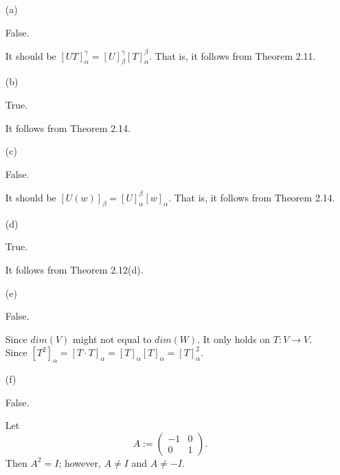 \begin{Exercise}
\begin{enumerate}[(a)]
\item[(a)]
\begin{answer}
False.
\end{answer}
\begin{solution}
It should be $[UT]_{\alpha}^{\gamma} = [U]_{\beta}^{\gamma}[T]_{\alpha}^{\beta}$. That is, it follows from Theorem 2.11.
\end{solution}

\item[(b)]
\begin{answer}
True.
\end{answer}
\begin{solution}
It follows from Theorem 2.14.
\end{solution}

\item[(c)]
\begin{answer}
False.
\end{answer}
\begin{solution}
It should be $[U(w)]_{\beta} = [U]_{\alpha}^{\beta}[w]_{\alpha}$. That is, it follows from Theorem 2.14.
\end{solution}

\item[(d)]
\begin{answer}
True.
\end{answer}
\begin{solution}
It follows from Theorem 2.12(d).
\end{solution}

\item[(e)]
\begin{answer}
False.
\end{answer}
\begin{solution}
Since $dim(V)$ might not equal to $dim(W)$.
It only holds on $T:V\to V$. Since $[T^2]_{\alpha} = [T\cdot T]_{\alpha} = [T]_{\alpha}[T]_{\alpha} = [T]_{\alpha}^2$.
\end{solution}

\item[(f)]
\begin{answer}
False.
\end{answer}
\begin{solution}
Let
$$
A := \begin{pmatrix}
-1 & 0 \\
0 & 1
\end{pmatrix}.
$$
Then $A^2 = I$; however, $A\neq I$ and $A\neq -I$.
\end{solution}


\end{enumerate}
\end{Exercise}
